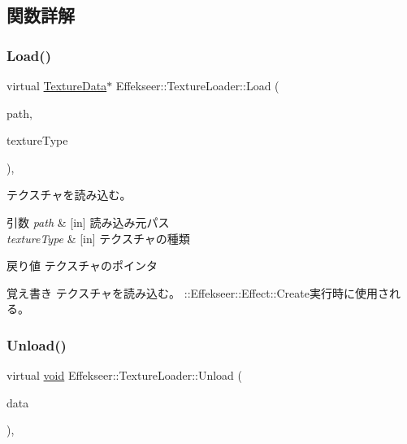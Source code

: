 \subsection{関数詳解}
\mbox{\label{class_effekseer_1_1_texture_loader_a91cc55233a4131d9994857dfe611460b}} 
\subsubsection{\texorpdfstring{Load()}{Load()}}
{\footnotesize\ttfamily virtual \mbox{\hyperlink{struct_effekseer_1_1_texture_data}{Texture\+Data}}$\ast$ Effekseer\+::\+Texture\+Loader\+::\+Load (\begin{DoxyParamCaption}\item[{const \mbox{\hyperlink{_effekseer_8h_aca7eb5de6dd019c19ac58ea35a193f2f}{E\+F\+K\+\_\+\+C\+H\+AR}} $\ast$}]{path,  }\item[{\mbox{\hyperlink{namespace_effekseer_a781925ba462884c4ef87fd38ffdedba4}{Texture\+Type}}}]{texture\+Type }\end{DoxyParamCaption})\hspace{0.3cm}{\ttfamily [inline]}, {\ttfamily [virtual]}}



テクスチャを読み込む。 


\begin{DoxyParams}{引数}
{\em path} & \mbox{[}in\mbox{]} 読み込み元パス \\
\hline
{\em texture\+Type} & \mbox{[}in\mbox{]} テクスチャの種類 \\
\hline
\end{DoxyParams}
\begin{DoxyReturn}{戻り値}
テクスチャのポインタ 
\end{DoxyReturn}
\begin{DoxyNote}{覚え書き}
テクスチャを読み込む。 \+::\+Effekseer\+::\+Effect\+::\+Create実行時に使用される。 
\end{DoxyNote}
\mbox{\label{class_effekseer_1_1_texture_loader_a128fdd6e613758012fb9ceaf2881adb7}} 
\subsubsection{\texorpdfstring{Unload()}{Unload()}}
{\footnotesize\ttfamily virtual \mbox{\hyperlink{namespace_effekseer_ab34c4088e512200cf4c2716f168deb56}{void}} Effekseer\+::\+Texture\+Loader\+::\+Unload (\begin{DoxyParamCaption}\item[{\mbox{\hyperlink{struct_effekseer_1_1_texture_data}{Texture\+Data}} $\ast$}]{data }\end{DoxyParamCaption})\hspace{0.3cm}{\ttfamily [inline]}, {\ttfamily [virtual]}}



